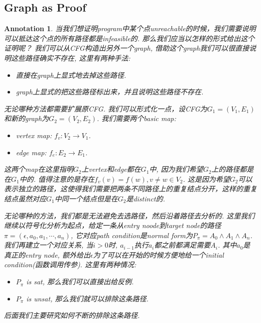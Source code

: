 \documentclass{article}
\newtheorem{annotation}[theorem]{Annotation}
\begin{document}

\newpage
\subsection{Graph as Proof}

\begin{annotation}
\rm 当我们想证明program中某个点unreachable的时候，我们需要说明可以抵达这个点的所有路径都是infeasible的. 那么我们应当以怎样的形式给出这个证明呢？ 我们可以从CFG构造出另外一个graph, 借助这个graph我们可以很直接说明这些路径确实不存在, 这里有两种手法:
\begin{itemize}
	\item 直接在graph上显式地去掉这些路径.
	\item graph上显式的把这些路径标出来，并且说明这些路径不存在.
\end{itemize}
无论哪种方法都需要扩展原CFG. 我们可以形式化一点，设CFG为$G_1 = (V_1,E_1)$和新的graph为$G_2 = (V_2, E_2)$. 我们需要两个basic map:
\begin{itemize}
	\item vertex map: $f_v: V_2 \to V_1$.
	\item edge map: $f_e: E_2 \to E_1$.
\end{itemize}
这两个map在这里指明$G_2$上vertex和edge都在$G_1$中, 因为我们希望$G_2$上的路径都是在$G_1$中的. 值得注意的是存在$f_v(v) = f(w), v \neq w \in V_2$. 这是因为希望$G_2$可以表示独立的路径，这使得我们需要把两条不同路径上的重复结点分开，这样的重复结点虽然对应$G_1$中同一个结点但是在$G_2$是distinct的.

无论哪种的方法，我们都是无法避免去选路径，然后沿着路径去分析的. 这里我们继续以符号化分析为起点，给定一条从entry noode到target node的路径$\pi = (\epsilon, a_0, a_1, \cdots, a_n)$, 它对应path condition是normal form为$P_\pi = A_0 \wedge A_1 \wedge A_n$. 我们再建立一个对应关系, 当$i > 0$时, $a_{i-1}$执行$a_i$都之前都满足需要$A_i$. 其中$a_0$是真正的entry node, 额外给出$\epsilon$为了可以在开始的时候方便地给一个initial condition(函数调用传参). 这里有两种情况:
\begin{itemize}
	\item $P_\pi$ is sat, 那么我们可以直接出给反例.
	\item $P_\pi$ is unsat, 那么我们就可以排除这条路径. 
\end{itemize}
后面我们主要研究如何不断的排除这条路径.
\end{annotation}
\end{document}
